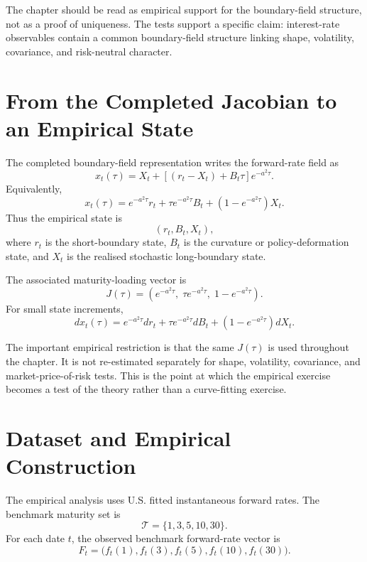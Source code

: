 \documentclass[11pt,oneside]{book}
\begin{document}
The chapter should be read as empirical support for the boundary-field structure, not as a proof of uniqueness. The tests support a specific claim: interest-rate observables contain a common boundary-field structure linking shape, volatility, covariance, and risk-neutral character.

\section{From the Completed Jacobian to an Empirical State}

The completed boundary-field representation writes the forward-rate field as
\begin{equation}
x_t(\tau)
=
X_t
+
\left[(r_t-X_t)+B_t\tau\right]e^{-a^2\tau}.
\label{eq:empirical-state}
\end{equation}
Equivalently,
\[
x_t(\tau)
=
e^{-a^2\tau}r_t
+
\tau e^{-a^2\tau}B_t
+
\left(1-e^{-a^2\tau}\right)X_t.
\]
Thus the empirical state is
\[
(r_t,B_t,X_t),
\]
where \(r_t\) is the short-boundary state, \(B_t\) is the curvature or policy-deformation state, and \(X_t\) is the realised stochastic long-boundary state.

The associated maturity-loading vector is
\begin{equation}
J(\tau)
=
\left(
e^{-a^2\tau},
\;
\tau e^{-a^2\tau},
\;
1-e^{-a^2\tau}
\right).
\label{eq:empirical-jacobian}
\end{equation}
For small state increments,
\begin{equation}
dx_t(\tau)
=
e^{-a^2\tau}dr_t
+
\tau e^{-a^2\tau}dB_t
+
\left(1-e^{-a^2\tau}\right)dX_t.
\label{eq:empirical-increments}
\end{equation}

The important empirical restriction is that the same \(J(\tau)\) is used throughout the chapter. It is not re-estimated separately for shape, volatility, covariance, and market-price-of-risk tests. This is the point at which the empirical exercise becomes a test of the theory rather than a curve-fitting exercise.

\section{Dataset and Empirical Construction}

The empirical analysis uses U.S. fitted instantaneous forward rates. The benchmark maturity set is
\begin{equation}
\mathcal{T}
=
\{1,3,5,10,30\}.
\label{eq:empirical-tenors}
\end{equation}
For each date \(t\), the observed benchmark forward-rate vector is
\begin{equation}
F_t
=
\big(f_t(1),f_t(3),f_t(5),f_t(10),f_t(30)\big).
\label{eq:empirical-forward-vector}
\end{equation}
\end{document}
